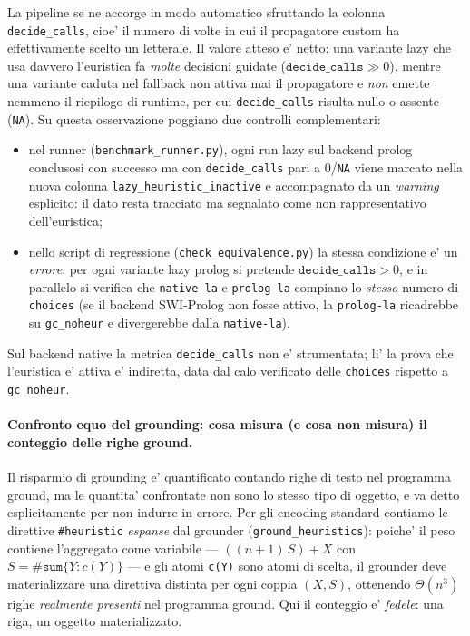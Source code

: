 La pipeline se ne accorge in modo automatico sfruttando la colonna
\texttt{decide\_calls}, cioe' il numero di volte in cui il propagatore custom ha
effettivamente scelto un letterale. Il valore atteso e' netto: una variante lazy
che usa davvero l'euristica fa \emph{molte} decisioni guidate
($\texttt{decide\_calls} \gg 0$), mentre una variante caduta nel fallback non
attiva mai il propagatore e \emph{non} emette nemmeno il riepilogo di runtime, per
cui \texttt{decide\_calls} risulta nullo o assente (\texttt{NA}). Su questa
osservazione poggiano due controlli complementari:
\begin{itemize}
  \item nel runner (\texttt{benchmark\_runner.py}), ogni run lazy sul backend
        prolog conclusosi con successo ma con \texttt{decide\_calls} pari a
        $0$/\texttt{NA} viene marcato nella nuova colonna
        \texttt{lazy\_heuristic\_inactive} e accompagnato da un \emph{warning}
        esplicito: il dato resta tracciato ma segnalato come non rappresentativo
        dell'euristica;
  \item nello script di regressione (\texttt{check\_equivalence.py}) la stessa
        condizione e' un \emph{errore}: per ogni variante lazy prolog si
        pretende $\texttt{decide\_calls} > 0$, e in parallelo si verifica che
        \texttt{native-la} e \texttt{prolog-la} compiano lo \emph{stesso} numero
        di \texttt{choices} (se il backend SWI-Prolog non fosse attivo, la
        \texttt{prolog-la} ricadrebbe su \texttt{gc\_noheur} e divergerebbe dalla
        \texttt{native-la}).
\end{itemize}
Sul backend native la metrica \texttt{decide\_calls} non e' strumentata; li' la
prova che l'euristica e' attiva e' indiretta, data dal calo verificato delle
\texttt{choices} rispetto a \texttt{gc\_noheur}.


\paragraph{Confronto equo del grounding: cosa misura (e cosa non misura) il conteggio delle righe ground.}
Il risparmio di grounding e' quantificato contando righe di testo nel programma
ground, ma le quantita' confrontate non sono lo stesso tipo di oggetto, e va
detto esplicitamente per non indurre in errore. Per gli encoding standard
contiamo le direttive \texttt{\#heuristic} \emph{espanse} dal grounder
(\texttt{ground\_heuristics}): poiche' il peso contiene l'aggregato come variabile
--- $((n{+}1)\,S){+}X$ con $S=\#\mathtt{sum}\{Y:c(Y)\}$ --- e gli atomi
\texttt{c(Y)} sono atomi di scelta, il grounder deve materializzare una direttiva
distinta per ogni coppia $(X,S)$, ottenendo $\Theta(n^3)$ righe \emph{realmente
presenti} nel programma ground. Qui il conteggio e' \emph{fedele}: una riga, un
oggetto materializzato.

